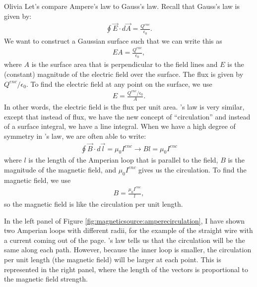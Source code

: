 \begin{studentOpinion}{Olivia}
Let's compare Ampere's law to Gauss's law. Recall that Gauss's law is given by:
\begin{align*}
\oint \vec{E}\cdot d\vec{A}=\frac{Q^{enc}}{\epsilon_0}.
\end{align*}
We want to construct a Gaussian surface such that we can write this as 
\begin{align*}
EA=\frac{Q^{enc}}{\epsilon_0},
\end{align*}
where $A$ is the surface area that is perpendicular to the field lines and $E$ is the (constant) magnitude of the electric field over the surface. The flux is given by $Q^{enc}/\epsilon_0$. To find the electric field at any point on the surface, we use
\begin{align*}
E=\frac{Q^{enc}/\epsilon_0}{A}.
\end{align*}
In other words, the electric field is the flux per unit area. \ampere's law is very similar, except that instead of flux, we have the new concept of ``circulation'' and instead of a surface integral, we have a line integral. When we have a high degree of symmetry in \ampere's law, we are often able to write:
\begin{align*}
\oint \vec{B}\cdot d\vec{l}=\mu_0 I^{enc}\rightarrow Bl=\mu_0 I^{enc}
\end{align*}
where $l$ is the length of the Amperian loop that is parallel to the field, $B$ is the magnitude of the magnetic field, and $\mu_0 I^{enc}$ gives us the circulation. To find the magnetic field, we use
\begin{align*}
B=\frac{\mu_0 I^{enc}}{l},
\end{align*}
so the magnetic field is like the circulation per unit length.

In the left panel of Figure \ref{fig:magneticsource:amperecirculation}, I have shown two Amperian loops with different radii, for the example of the straight wire with a current coming out of the page. \ampere's law tells us that the circulation will be the same along each path. However, because the inner loop is smaller, the circulation per unit length (the magnetic field) will be larger at each point. This is represented in the right panel, where the length of the vectors is proportional to the magnetic field strength.  


\end{studentOpinion}


